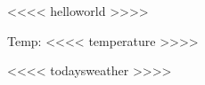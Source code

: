 \documentclass{article}
\begin{document}
<<<< helloworld >>>>

Temp: <<<< temperature >>>>

<<<< todaysweather >>>>
\end{document}
